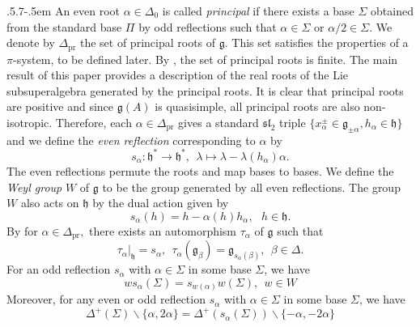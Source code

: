 \documentclass[11pt,reqno]{amsart}
\makeatletter
\theoremstyle{plain}
\theoremstyle{definition}
\theoremstyle{remark}
\newcommand{\lie}[1]{\mathfrak{#1}}
\numberwithin{equation}{section}
\def\subsection{\def\@secnumfont{\bfseries}\@startsection{subsection}{2}%
  {\parindent}{.5\linespacing\@plus.7\linespacing}{-.5em}%
  {\normalfont\bfseries}}
\makeatother
\begin{document}
\subsection{}An even root $\alpha\in\Delta_0$ is called \textit{principal} if there exists a base $\Sigma$ obtained from the standard base $\Pi$ by odd reflections such that $\alpha\in \Sigma$ or $\alpha/2\in\Sigma.$ We denote by $\Delta_{\mathrm{pr}}$ the set of principal roots of $\mathfrak{g}$. This set satisfies the properties of a $\pi$-system, to be defined later. By \cite[Section 9]{Serganova11KacMoody}, the set of principal roots is finite. The main result of this paper provides a description of the real roots of the Lie subsuperalgebra generated by the principal roots. It is clear that principal roots are positive and since $\lie g(A)$ is quasisimple, all principal roots are also non-isotropic. Therefore, each $\alpha\in \Delta_{\mathrm{pr}}$ gives a standard $\mathfrak{sl}_2$ triple $\{x_{\alpha}^{\pm}\in \lie g_{\pm \alpha}, h_{\alpha}\in \lie h\}$ and we define the \textit{even reflection} corresponding to $\alpha$ by
$$s_\alpha:\lie{h}^*\to \lie{h}^*,\ \ \lambda\mapsto \lambda-\lambda(h_\alpha)\alpha.$$ 
The even reflections permute the roots and map bases to bases. We define the \textit{Weyl group} $W$ of $\lie g$ to be the group generated by all even reflections. The group $W$ also acts on $\lie h$ by the dual action given by $$s_\alpha(h)=h-\alpha(h)h_\alpha,\ \ \ h\in \lie{h}.$$ By \cite[Lemma 3.8]{Kac90Infinite} for $\alpha\in\Delta_{\mathrm{pr}},$ there exists an automorphism $\tau_\alpha$ of $\lie{g}$ such that $$\tau_\alpha|_{\lie{h}}=s_\alpha,\ \ \tau_\alpha(\lie g_\beta)=\lie g_{s_\alpha(\beta)},\ \ \beta\in\Delta.$$
For an odd reflection $s_{\alpha}$ with $\alpha\in \Sigma$ in some base $\Sigma$, we have
\begin{equation}\label{11a}ws_{\alpha}(\Sigma)=s_{w(\alpha)}w(\Sigma),\ \ w\in W\end{equation}
Moreover, for any even or odd reflection $s_{\alpha}$ with $\alpha\in \Sigma$ in some base $\Sigma$, we have
$$\Delta^+(\Sigma)\backslash\{\alpha,2\alpha\}=\Delta^+(s_{\alpha}(\Sigma))\backslash\{-\alpha,-2\alpha\}$$
\end{document}
